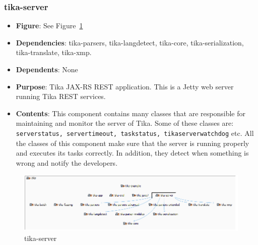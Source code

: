 \documentclass{article}
\begin{document}
\subsubsection{tika-server}
\begin {itemize}
\item \textbf{Figure}: See Figure~\ref{fig:tika-server}
\item \textbf{Dependencies}: tika-parsers, tika-langdetect, tika-core, tika-serialization, tika-translate, tika-xmp.
\item \textbf{Dependents}: None
\item \textbf{Purpose}: Tika JAX-RS REST application. This is a Jetty web server running Tika REST services.
\item \textbf{Contents}: This component contains many classes that are responsible for maintaining and monitor the server of Tika. Some of these classes are: \texttt{serverstatus, servertimeout, taskstatus, tikaserverwatchdog} etc. All the classes of this component make sure that the server is running properly and executes its tasks correctly. In addition, they detect when something is wrong and notify the developers.
\end{itemize}
\begin{figure}[ht]
    \centering
    \includegraphics[width=1\textwidth]{report/images/tika-server.PNG}
    \caption{tika-server}
    \label{fig:tika-server}
\end{figure}
\end{document}
